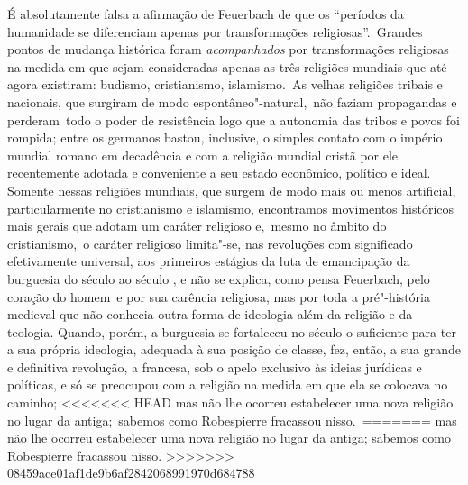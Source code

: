 É absolutamente falsa a afirmação
de Feuerbach
de que os ``períodos da humanidade se diferenciam apenas por
transformações religiosas''. \textbar{}\,Grandes pontos de mudança histórica
foram \emph{acompanhados} por transformações religiosas na medida em
que sejam consideradas apenas as três religiões mundiais que até agora %
existiram: budismo, cristianismo, islamismo.\,\textbar{} As velhas religiões
tribais e nacionais, que surgiram de modo espontâneo"-natural, \textbar{}\,não
faziam propagandas e perderam\,\textbar{} todo o poder de resistência logo que a %
autonomia das tribos e povos foi rompida; entre os germanos bastou,
inclusive, o simples contato com o império mundial romano em decadência e
com a religião mundial cristã por ele recentemente adotada e conveniente
a seu estado econômico, político e ideal. Somente nessas religiões
mundiais, que surgem de modo mais ou menos artificial, particularmente
no cristianismo e islamismo, encontramos movimentos históricos mais
gerais que adotam um caráter religioso e, \textbar{}\,mesmo no âmbito do
cristianismo,\,\textbar{} o caráter religioso limita"-se, nas revoluções com
significado efetivamente universal, aos primeiros estágios da luta de
emancipação da burguesia do século  ao século , e não se
explica, como pensa
Feuerbach,
pelo coração do homem\est\ e por sua carência religiosa, mas por toda a
pré"-história medieval que não conhecia outra forma de ideologia além da
religião e da teologia. Quando, porém, a burguesia se
fortaleceu no século  o suficiente para ter a sua própria ideologia, adequada à
sua posição de classe, fez, então, a sua grande e definitiva revolução,
a francesa, sob o apelo exclusivo às ideias jurídicas e políticas, e só se
preocupou com a religião na medida em que ela se colocava no caminho;
<<<<<<< HEAD
mas não lhe ocorreu estabelecer uma nova religião no lugar da antiga; \textbar{}\,sabemos como Robespierre fracassou nisso.\,\textbar{}
=======
mas não lhe ocorreu estabelecer uma nova religião no lugar da antiga; \textbar{}
sabemos como Robespierre fracassou nisso. \textbar{}
>>>>>>> 08459ace01af1de9b6af2842068991970d684788

